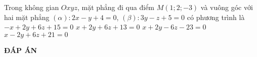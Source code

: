 \begin{ex}%
	Trong không gian $Oxyz$, mặt phẳng đi qua điểm $M(1;2;-3)$ và vuông góc với hai mặt phẳng $\left(\alpha \right)\colon 2 x-y+4=0$, $\left(\beta \right) \colon 3y-z+5=0$ có phương trình là
	\choice
	{$-x+2y+6 z+15=0$}
	{\True $x+2y+6 z+13=0$}
	{$x+2y-6z-23=0$}
	{$x-2y+6 z+21=0$}
\end{ex}

\newpage
\begin{center}
	\textbf{ĐÁP ÁN}
\end{center}
\begin{multicols}{10}
	 
\end{multicols}